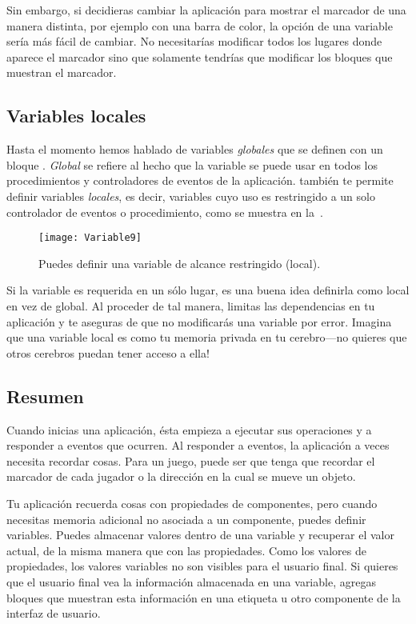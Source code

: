 Sin embargo, si decidieras cambiar la aplicación para mostrar el
marcador de una manera distinta, por ejemplo con una barra de color,
la opción de una variable sería más fácil de cambiar. No necesitarías
modificar todos los lugares donde aparece el marcador sino que
solamente tendrías que modificar los bloques que muestran el marcador.

\subsection*{Variables locales}

Hasta el momento hemos hablado de variables \emph{globales} que se
definen con un bloque . \emph{Global} se
refiere al hecho que la variable se puede usar en todos los
procedimientos y controladores de eventos de la
aplicación. \AppInventor también te permite definir variables
\emph{locales}, es decir, variables cuyo uso es restringido a un solo
controlador de eventos o procedimiento, como se muestra en
la~.

\begin{figure}[H]
\centering
\texttt{[image: Variable9]}
\caption{Puedes definir una variable de alcance restringido (local).}
\label{fig:Variable9}
\end{figure}

Si la variable es requerida en un sólo lugar, es una buena idea
definirla como local en vez de global. Al proceder de tal manera,
limitas las dependencias en tu aplicación y te aseguras de que no
modificarás una variable por error. Imagina que una variable local es
como tu memoria privada en tu cerebro---no quieres que otros cerebros
puedan tener acceso a ella!

\subsection*{Resumen}

Cuando inicias una aplicación, ésta empieza a ejecutar sus operaciones
y a responder a eventos que ocurren. Al responder a eventos, la
aplicación a veces necesita recordar cosas. Para un juego, puede ser
que tenga que recordar el marcador de cada jugador o la dirección en
la cual se mueve un objeto.

Tu aplicación recuerda cosas con propiedades de componentes, pero
cuando necesitas memoria adicional no asociada a un componente, puedes
definir variables. Puedes almacenar valores dentro de una variable y
recuperar el valor actual, de la misma manera que con las
propiedades. Como los valores de propiedades, los valores variables no
son visibles para el usuario final. Si quieres que el usuario final
vea la información almacenada en una variable, agregas bloques que
muestran esta información en una etiqueta u otro componente de la
interfaz de usuario.

